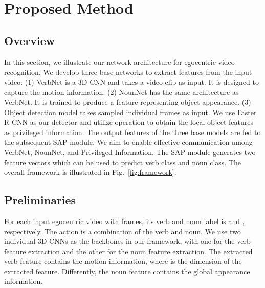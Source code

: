\documentclass[letterpaper]{article} \usepackage{aaai20}  \usepackage{times}  \usepackage{helvet} \usepackage{courier}  \usepackage[hyphens]{url}  \usepackage{graphicx} \urlstyle{rm} \def\UrlFont{\rm}  \usepackage{graphicx}  \frenchspacing  \setlength{\pdfpagewidth}{8.5in}  \setlength{\pdfpageheight}{11in}  \usepackage{amsfonts,amssymb}
\begin{document}
\section{Proposed Method}

\subsection{Overview}
In this section, we illustrate our network architecture for egocentric video recognition. We develop three base networks to extract features from the input video: 
(1) VerbNet is a 3D CNN and takes a video clip as input. It is designed to capture the motion information. 
(2) NounNet has the same architecture as VerbNet. It is trained to produce a feature representing object appearance. 
(3) Object detection model takes sampled individual frames as input. We use Faster R-CNN as our detector and utilize  operation to obtain the local object features as privileged information. The output features of the three base models are fed to the subsequent SAP module. We aim to enable effective communication among VerbNet, NounNet, and Privileged Information. The SAP module generates two feature vectors which can be used to predict verb class and noun class. The overall framework is illustrated in Fig.~\ref{fig:framework}.


\subsection{Preliminaries}
For each input egocentric video  with  frames,
its verb and noun label is  and , respectively.
The action  is a combination of the verb and noun. 
We use two individual 3D CNNs as the backbones in our framework, with one for the verb feature extraction and the other for the noun feature extraction.
The extracted verb feature  contains the motion information, where  is the dimension of the extracted feature. Differently, the noun feature  contains the global appearance information.
\end{document}
